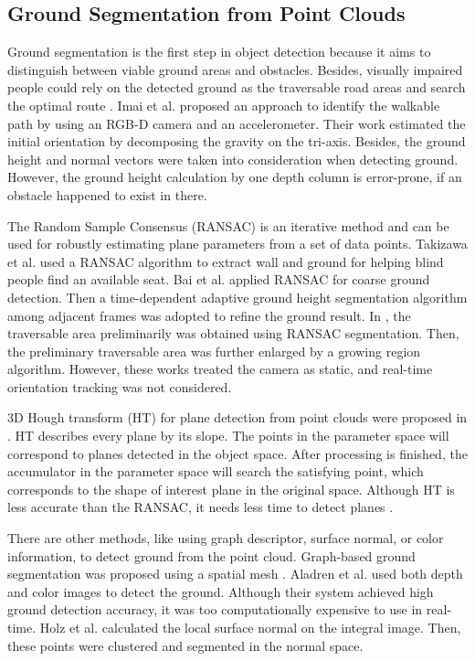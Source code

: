 \documentclass{ieeeaccess}
\begin{document}
\subsection{Ground Segmentation from Point Clouds}

Ground segmentation is the first step in object detection because it aims to distinguish between viable ground areas and obstacles. Besides, visually impaired people could rely on the detected ground as the traversable road areas and search the optimal route \cite{IEEEexample:yang2018automatic}. Imai et al. \cite{IEEEexample:imai2017detecting} proposed an approach to identify the walkable path by using an RGB-D camera and an accelerometer. Their work estimated the initial orientation by decomposing the gravity on the tri-axis. Besides, the ground height and normal vectors were taken into consideration when detecting ground. However, the ground height calculation by one depth column is error-prone, if an obstacle happened to exist in there.

The Random Sample Consensus (RANSAC) is an iterative method and can be used for robustly estimating plane parameters from a set of data points. Takizawa et al. \cite{IEEEexample:takizawa2019kinect} used a RANSAC algorithm to extract wall and ground for helping blind people find an available seat. Bai et al. \cite{IEEEexample:bai2019wearable} applied RANSAC for coarse ground detection. Then a time-dependent adaptive ground height segmentation algorithm among adjacent frames was adopted to refine the ground result. In \cite{IEEEexample:yang2016expanding}, the traversable area preliminarily was obtained using RANSAC segmentation. Then, the preliminary traversable area was further enlarged by a growing region algorithm. However, these works treated the camera as static, and real-time orientation tracking was not considered. 

3D Hough transform (HT) for plane detection from point clouds were proposed in \cite{IEEEexample:hulik2014continuous}. HT describes every plane by its slope. The points in the parameter space will correspond to planes detected in the object space. After processing is finished, the accumulator in the parameter space will search the satisfying point, which corresponds to the shape of interest plane in the original space. Although HT is less accurate than the RANSAC, it needs less time to detect planes \cite{IEEEexample:zeineldin2016fast}.
 
 
There are other methods, like using graph descriptor, surface normal, or color information, to detect ground from the point cloud. Graph-based ground segmentation was proposed using a spatial mesh \cite{IEEEexample:strom2010graph}. Aladren et al. \cite{IEEEexample:aladren2014navigation} used both depth and color images to detect the ground. Although their system achieved high ground detection accuracy, it was too computationally expensive to use in real-time.  Holz et al. \cite{IEEEexample:holz2011real} calculated the local surface normal on the integral image. Then, these points were clustered and segmented in the normal space.
\end{document}
